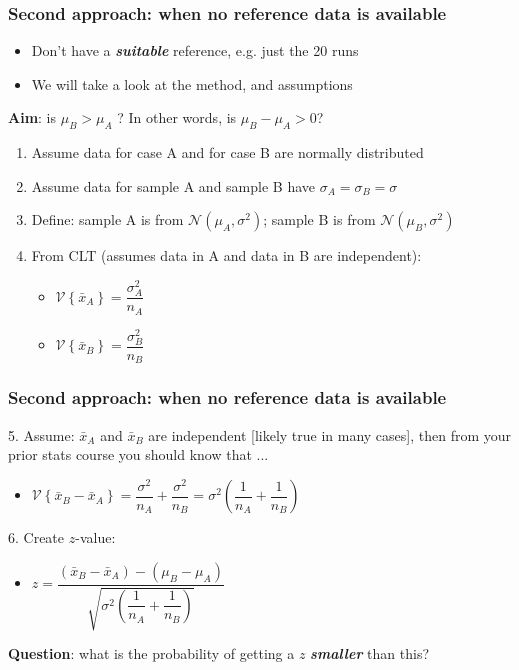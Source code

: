 \begin{frame}\frametitle{Second approach: when no reference data is available}
	\begin{itemize}
		\item	Don't have a \textbf{\emph{suitable}} reference, e.g. just the 20 runs
		\item	We will take a look at the method, and assumptions
	\end{itemize}

	\textbf{Aim}: is $\mu_B > \mu_A$ ? In other words, is $\mu_B - \mu_A > 0$?
	\begin{enumerate}
		\item	Assume data for case A and for case B are normally distributed
		\item	Assume data for sample A and sample B have $\sigma_A = \sigma_B = \sigma$
		\item	Define: sample A is from $\mathcal{N}\left(\mu_A, \sigma^2\right)$; sample B is from $\mathcal{N}\left(\mu_B, \sigma^2\right)$
		\item	From CLT (assumes data in A and data in B are independent):  {\color{myOrange}{\small $\longleftarrow$ but, but ... we know that's not true here!}}
			\begin{itemize}
				\item	$\mathcal{V}\left\{\bar{x}_A\right\} = \dfrac{\sigma^2_A}{n_A}$
				\item	$\mathcal{V}\left\{\bar{x}_B\right\} = \dfrac{\sigma^2_B}{n_B}$
			\end{itemize}
	\end{enumerate}

\end{frame}

\begin{frame}\frametitle{Second approach: when no reference data is available}

	5. Assume: $\bar{x}_A$ and $\bar{x}_B$ are independent [likely true in many cases], then from your prior stats course you should know that ...
	\begin{itemize}
		\item	$\mathcal{V}\left\{\bar{x}_B - \bar{x}_A\right\} = \dfrac{\sigma^2}{n_A} + \dfrac{\sigma^2}{n_B} = \sigma^2 \left(\dfrac{1}{n_A} + \dfrac{1}{n_B}\right)$
	\end{itemize}

	6. Create $z$-value:
	\begin{itemize}
		\item	$z = \dfrac{(\bar{x}_B - \bar{x}_A) - (\mu_B - \mu_A)}{\sqrt{\sigma^2 \left(\dfrac{1}{n_A} + \dfrac{1}{n_B}\right)}}$
	\end{itemize}

	\textbf{Question}: what is the probability of getting a $z$ \textbf{\emph{smaller}} than this?
\end{frame}

